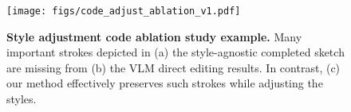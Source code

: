 \begin{figure}[!t]
  \centering
  \texttt{[image: figs/code\_adjust\_ablation\_v1.pdf]}
  \caption{
\textbf{Style adjustment code ablation study example.}
Many important strokes depicted in (a) the style-agnostic completed sketch are missing from (b) the VLM direct editing results. 
In contrast, (c) our method effectively preserves such strokes while adjusting the styles. 
}
  \label{fig:code_ablation}
\end{figure}
